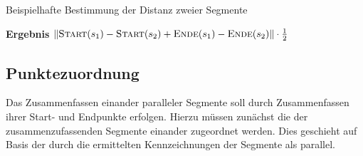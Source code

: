 \documentclass[../main/thesis.tex]{subfiles}
\begin{document}

\begin{algorithmhere}{Beispielhafte Bestimmung der Distanz zweier Segmente}
\label{alg:Distanz}
\begin{algorithmic}
	\State \textbf{Ergebnis} $\abs\textproc{Start}(s_1) - \textproc{Start}(s_2) + \textproc{Ende}(s_1) - \textproc{Ende}(s_2)\abs \cdot \frac{1}{2}$
\EndFunction
\end{algorithmic}
\end{algorithmhere}



\subsection{Punktezuordnung}
\label{ch:correlation-algorithm}

%
%

Das Zusammenfassen einander paralleler Segmente soll durch Zusammenfassen ihrer Start- und Endpunkte erfolgen.
Hierzu müssen zunächst die  der zusammenzufassenden Segmente einander zugeordnet werden.
Dies geschieht auf Basis der durch die  ermittelten Kennzeichnungen der Segmente als parallel.
\end{document}

